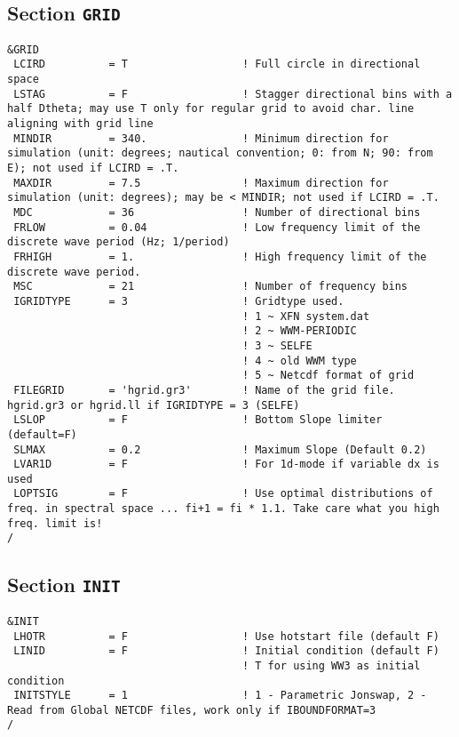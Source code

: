 \documentclass[12pt]{amsart}
\begin{document}
\subsection{Section {\tt GRID}}

\begin{verbatim}
&GRID
 LCIRD          = T                  ! Full circle in directional space
 LSTAG          = F                  ! Stagger directional bins with a half Dtheta; may use T only for regular grid to avoid char. line aligning with grid line
 MINDIR         = 340.               ! Minimum direction for simulation (unit: degrees; nautical convention; 0: from N; 90: from E); not used if LCIRD = .T.
 MAXDIR         = 7.5                ! Maximum direction for simulation (unit: degrees); may be < MINDIR; not used if LCIRD = .T.
 MDC            = 36                 ! Number of directional bins
 FRLOW          = 0.04               ! Low frequency limit of the discrete wave period (Hz; 1/period)
 FRHIGH         = 1.                 ! High frequency limit of the discrete wave period.
 MSC            = 21                 ! Number of frequency bins
 IGRIDTYPE      = 3                  ! Gridtype used.
                                     ! 1 ~ XFN system.dat
                                     ! 2 ~ WWM-PERIODIC
                                     ! 3 ~ SELFE
                                     ! 4 ~ old WWM type 
                                     ! 5 ~ Netcdf format of grid
 FILEGRID       = 'hgrid.gr3'        ! Name of the grid file. hgrid.gr3 or hgrid.ll if IGRIDTYPE = 3 (SELFE)
 LSLOP          = F                  ! Bottom Slope limiter (default=F)
 SLMAX          = 0.2                ! Maximum Slope (Default 0.2)
 LVAR1D         = F                  ! For 1d-mode if variable dx is used
 LOPTSIG        = F                  ! Use optimal distributions of freq. in spectral space ... fi+1 = fi * 1.1. Take care what you high freq. limit is!
/
\end{verbatim}




\subsection{Section {\tt INIT}}

\begin{verbatim}
&INIT
 LHOTR          = F                  ! Use hotstart file (default F)
 LINID          = F                  ! Initial condition (default F)
                                     ! T for using WW3 as initial condition
 INITSTYLE      = 1                  ! 1 - Parametric Jonswap, 2 - Read from Global NETCDF files, work only if IBOUNDFORMAT=3
/
\end{verbatim}
\end{document}
